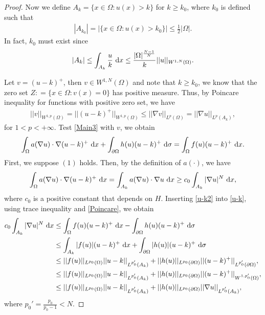 \documentclass[reqno, 11pt]{amsart} %
\numberwithin{equation}{section}
\theoremstyle{definition}
\newcommand{\pa}{\partial}
\newcommand{\dx}{\textup{d}x}
\begin{document}
\begin{proof}
    Now we  define $A_k = \{x \in \Omega: u(x) > k\}$ for $k \geq k_0$, where $k_0$ is defined such that
    \begin{align*}
        |A_{k_0}| = |\{x \in \Omega: u(x) > k_0\}| \leq \frac{1}{2} |\Omega|.
    \end{align*}
    In fact, $k_0$ must exist since
    \begin{align*}
        |A_k| \leq \int_{A_k} \frac{u}{k} \ \dx \leq \frac{|\Omega|^{\frac{N-1}{N}}}{k} ||u||_{W^{1,N}(\Omega)}.
    \end{align*}
    
    Let $v = (u - k)^+$, then $v \in W^{1,N}(\Omega)$ and note that  $k\geq k_0$, we know that the zero set $Z : = \{x \in \Omega: v(x)=0\}$ has positive measure. Thus, by Poincare inequality for functions with positive zero set, we have
    \begin{align}\label{Poincare}
        ||v||_{W^{1,p}(\Omega)} =  ||(u-k)^+||_{W^{1,p}(\Omega)} \leq ||\nabla v||_{L^{p}(\Omega)} = ||\nabla u||_{L^{p}(A_k)},
    \end{align}
    for $1 < p < +\infty$. Test \eqref{Main3} with $v$, we obtain
    \begin{align}\label{u-k}
        \int_{\Omega} a(\nabla u) \cdot \nabla (u-k)^+ \ \dx + \int_{\partial \Omega} h(u) (u-k)^+ \ \text{d}\sigma= \int_{\Omega} f(u) (u-k)^+ \ \dx.
    \end{align}
    First, we suppose $(1)$ holds. %
    Then, by the definition of $a(\cdot)$, we have
    \begin{align}\label{u-k2}
        \int_{\Omega} a(\nabla u) \cdot \nabla (u-k)^+ \ \dx = \int_{A_k} a(\nabla u) \cdot \nabla u  \ \dx \geq c_0 \int_{A_k} |\nabla u|^N \ \dx,
    \end{align}
    where $c_0$ is a positive constant that depends on $H$. Inserting  \eqref{u-k2} into \eqref{u-k}, using trace inequality and \eqref{Poincare}, we obtain
    \begin{align}\label{u-k3}
        c_0 \int_{A_k} |\nabla u|^N \ \dx & \leq \int_{\Omega} f(u) (u-k)^+ \ \dx - \int_{\pa \Omega}h(u)(u-k)^+ \ \text{d} \sigma \nonumber\\
        & \leq  \int_{A_k} |f(u)| (u-k)^+ \ \dx +  \int_{\pa \Omega} |h(u)|(u-k)^+ \ \text{d} \sigma \\
        & \leq ||f(u)||_{L^{p_0}(\Omega)} ||u-k||_{L^{p_0'}(A_k)} + ||h(u)||_{L^{p_0}(\pa \Omega)} ||(u-k)^+||_{L^{p_0'}(\pa \Omega)}, \nonumber \\
        & \leq ||f(u)||_{L^{p_0}(\Omega)} ||u-k||_{L^{p_0'}(A_k)} + ||h(u)||_{L^{p_0}(\pa \Omega)} ||(u-k)^+||_{W^{1,p_0'}(\Omega)}, \nonumber \\
        & \leq ||f(u)||_{L^{p_0}(\Omega)} ||u-k||_{L^{p_0'}(A_k)} + ||h(u)||_{L^{p_0}(\pa \Omega)} ||\nabla u||_{L^{p_0'}(A_k)}, \nonumber
    \end{align}
    where $p_0' = \frac{p_0}{p_0-1}< N$. 
    

\end{proof}
\end{document}
